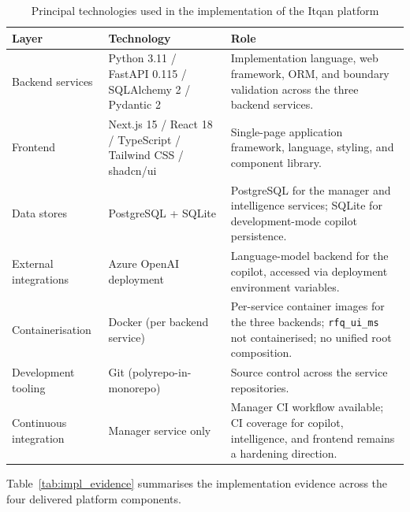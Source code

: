 \begin{table}[H]
\centering
\renewcommand{\arraystretch}{1.3}
\begin{tabular}{|p{3.4cm}|p{4.6cm}|p{6cm}|}
\hline
\rowcolor{lightgray}
\textbf{Layer} & \textbf{Technology} & \textbf{Role} \\ \hline
Backend services & Python 3.11 / FastAPI 0.115 / SQLAlchemy 2 / Pydantic 2 & Implementation language, web framework, ORM, and boundary validation across the three backend services. \\ \hline
Frontend & Next.js 15 / React 18 / TypeScript / Tailwind CSS / shadcn/ui & Single-page application framework, language, styling, and component library. \\ \hline
Data stores & PostgreSQL + SQLite & PostgreSQL for the manager and intelligence services; SQLite for development-mode copilot persistence. \\ \hline
External integrations & Azure OpenAI deployment & Language-model backend for the copilot, accessed via deployment environment variables. \\ \hline
Containerisation & Docker (per backend service) & Per-service container images for the three backends; \texttt{rfq\_ui\_ms} not containerised; no unified root composition. \\ \hline
Development tooling & Git (polyrepo-in-monorepo) & Source control across the service repositories. \\ \hline
Continuous integration & Manager service only & Manager CI workflow available; CI coverage for copilot, intelligence, and frontend remains a hardening direction. \\ \hline
\end{tabular}
\caption{Principal technologies used in the implementation of the Itqan platform}
\label{tab:toolchain}
\end{table}

Table~\ref{tab:impl_evidence} summarises the implementation evidence across the four delivered platform components.

